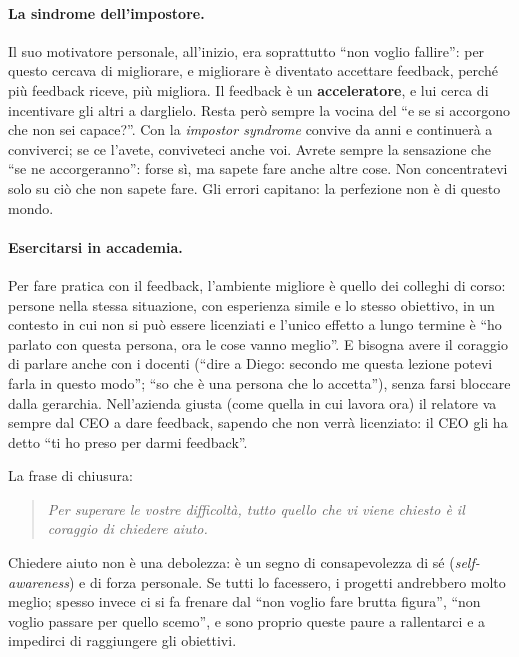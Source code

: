\paragraph{La sindrome dell'impostore.} Il suo motivatore personale, all'inizio,
era soprattutto ``non voglio fallire'': per questo cercava di migliorare, e
migliorare è diventato accettare feedback, perché più feedback riceve, più
migliora. Il feedback è un \textbf{acceleratore}, e lui cerca di incentivare
gli altri a darglielo. Resta però sempre la vocina del ``e se si accorgono che
non sei capace?''. Con la \emph{impostor syndrome} convive da anni e
continuerà a conviverci; se ce l'avete, conviveteci anche voi. Avrete sempre
la sensazione che ``se ne accorgeranno'': forse sì, ma sapete fare anche
altre cose. Non concentratevi solo su ciò che non sapete fare. Gli errori
capitano: la perfezione non è di questo mondo.

\paragraph{Esercitarsi in accademia.} Per fare pratica con il feedback,
l'ambiente migliore è quello dei colleghi di corso: persone nella stessa
situazione, con esperienza simile e lo stesso obiettivo, in un contesto in cui
non si può essere licenziati e l'unico effetto a lungo termine è ``ho parlato
con questa persona, ora le cose vanno meglio''. E bisogna avere il coraggio di
parlare anche con i docenti (``dire a Diego: secondo me questa lezione potevi
farla in questo modo''; ``so che è una persona che lo accetta''), senza farsi
bloccare dalla gerarchia. Nell'azienda giusta (come quella in cui lavora ora) il
relatore va sempre dal CEO a dare feedback, sapendo che non verrà licenziato:
il CEO gli ha detto ``ti ho preso per darmi feedback''.

La frase di chiusura:

\begin{quote}
  \emph{Per superare le vostre difficoltà, tutto quello che vi viene chiesto è
  il coraggio di chiedere aiuto.}
\end{quote}

Chiedere aiuto non è una debolezza: è un segno di consapevolezza di sé
(\emph{self-awareness}) e di forza personale. Se tutti lo facessero, i
progetti andrebbero molto meglio; spesso invece ci si fa frenare dal ``non
voglio fare brutta figura'', ``non voglio passare per quello scemo'', e sono
proprio queste paure a rallentarci e a impedirci di raggiungere gli obiettivi.

